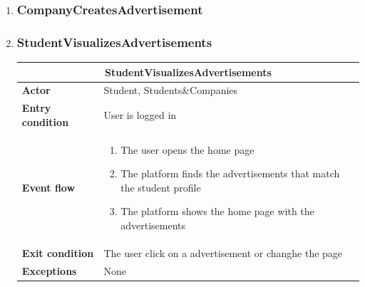 \begin{enumerate}[label=\textbf{UC\arabic* -}]
\item \subsubsection{CompanyCreatesAdvertisement}

\item \subsubsection{StudentVisualizesAdvertisements}

\begin{table}[H]
    \centering
    \begin{tabular}{|l|m{10cm}|}
        \hline \multicolumn{2}{|c|}{\textbf{StudentVisualizesAdvertisements}} \\
        \hline \textbf{Actor} & Student, Students\&Companies \\
        \hline \textbf{Entry condition} & User is logged in \\
        \hline \textbf{Event flow} &
            \begin{enumerate}
                \item The user opens the home page
                \item The platform finds the advertisements that match the student profile
                \item The platform shows the home page with the advertisements
            \end{enumerate} \\
        \hline \textbf{Exit condition} & The user click on a advertisement or changhe the page \\
        \hline \textbf{Exceptions} & None \\
        \hline
    \end{tabular}
\end{table}

\begin{figure}[H]
    \centering
\end{figure}


\end{enumerate}
